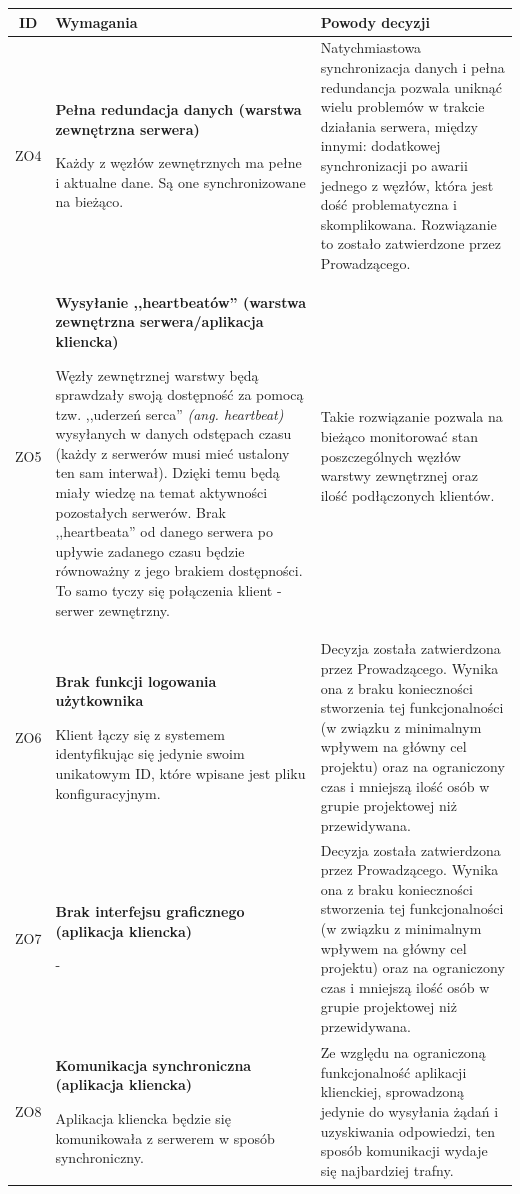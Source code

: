 \pagebreak

\begin{tabularx}{\textwidth}{|c|X|X|}
\hline
\textbf{ID} & \textbf{Wymagania}  & \textbf{Powody decyzji} \\
\hline
\label{z:ZO4} ZO4 &  \textbf{Pełna redundacja danych (warstwa zewnętrzna serwera)}

Każdy z węzłów zewnętrznych ma pełne i aktualne dane. Są one synchronizowane na bieżąco. & 
Natychmiastowa synchronizacja danych i pełna redundancja pozwala uniknąć wielu problemów w trakcie działania serwera, między innymi: dodatkowej synchronizacji po awarii jednego z węzłów, która jest dość problematyczna i skomplikowana. Rozwiązanie to zostało zatwierdzone przez Prowadzącego.\\
\hline

\label{z:ZO5} ZO5 &  \textbf{Wysyłanie ,,heartbeatów'' (warstwa zewnętrzna serwera/aplikacja kliencka)}

Węzły zewnętrznej warstwy będą sprawdzały swoją dostępność za pomocą tzw. ,,uderzeń serca'' \textit{(ang. heartbeat)} wysyłanych w danych odstępach czasu (każdy z serwerów musi mieć ustalony ten sam interwał). Dzięki temu będą miały wiedzę na temat aktywności pozostałych serwerów. Brak ,,heartbeata'' od danego serwera po upływie zadanego czasu będzie równoważny z jego brakiem dostępności. To samo tyczy się połączenia klient - serwer zewnętrzny. & 
Takie rozwiązanie pozwala na bieżąco monitorować stan poszczególnych węzłów warstwy zewnętrznej oraz ilość podłączonych klientów. \\
\hline

\label{z:ZO6} ZO6 &  \textbf{Brak funkcji logowania użytkownika}

Klient łączy się z systemem identyfikując się jedynie swoim unikatowym ID, które wpisane jest pliku konfiguracyjnym. & 
Decyzja została zatwierdzona przez Prowadzącego. Wynika ona z braku konieczności stworzenia tej funkcjonalności (w związku z minimalnym wpływem na główny cel projektu) oraz na ograniczony czas i mniejszą ilość osób w grupie projektowej niż przewidywana.  \\
\hline

\label{z:ZO7} ZO7 &  \textbf{Brak interfejsu graficznego (aplikacja kliencka)}

- & 
Decyzja została zatwierdzona przez Prowadzącego. Wynika ona z braku konieczności stworzenia tej funkcjonalności (w związku z minimalnym wpływem na główny cel projektu) oraz na ograniczony czas i mniejszą ilość osób w grupie projektowej niż przewidywana.
\\
\hline
\label{z:ZO8} ZO8 &  \textbf{Komunikacja synchroniczna (aplikacja kliencka)}

Aplikacja kliencka będzie się komunikowała z serwerem w sposób synchroniczny. & 
Ze względu na ograniczoną funkcjonalność aplikacji klienckiej, sprowadzoną jedynie do wysyłania żądań i uzyskiwania odpowiedzi, ten sposób komunikacji wydaje się najbardziej trafny. \\
\hline

\end{tabularx}

